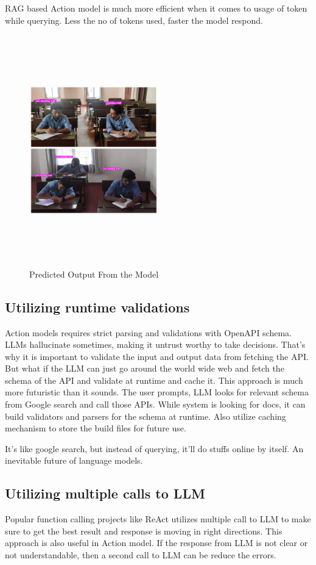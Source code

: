 \documentclass[conference]{IEEEtran}
\begin{document}
RAG based Action model is much more efficient when it comes to usage of token while querying. Less the no of tokens used, faster the model respond.

\begin{figure}[htbp]
\centering
\includegraphics[width=0.5\textwidth, height=10cm]{images/detection.jpeg}  
\caption{Predicted Output From the Model}
\label{fig}
\end{figure}


\subsection{Utilizing runtime validations}
Action models requires strict parsing and validations with OpenAPI schema. LLMs hallucinate sometimes, making it untrust worthy to take decisions. That's why it is important to validate the input and output data from fetching the API. But what if the LLM can just go around the world wide web and fetch the schema of the API and validate at runtime and cache it. This approach is much more futuristic than it sounds. The user prompts, LLM looks for relevant schema from Google search and call those APIs. While system is looking for docs, it can build validators and parsers for the schema at runtime. Also utilize caching mechanism to store the build files for future use. 

It's like google search, but instead of querying, it'll do stuffs online by itself. An inevitable future of language models. 

\subsection{Utilizing multiple calls to LLM}
Popular function calling projects like ReAct utilizes multiple call to LLM to make sure to get the best result and response is moving in right directions. This approach is also useful in Action model. If the response from LLM is not clear or not understandable, then a second call to LLM can be reduce the errors.
\end{document}
